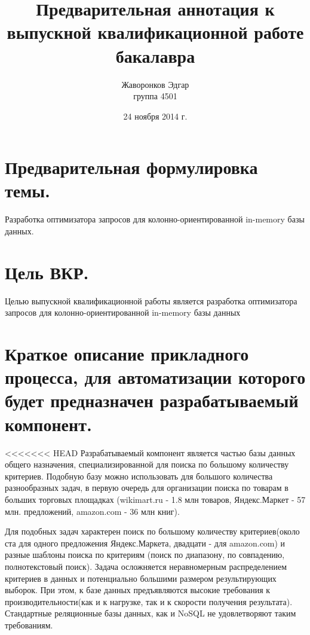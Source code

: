 \documentclass[12pt]{article}
\author{Жаворонков Эдгар \\ группа 4501}
\title{Предварительная аннотация к выпускной квалификационной работе бакалавра}
\date{24 ноября 2014 г.}
\begin{document}
    \section{Предварительная формулировка темы.}
        Разработка оптимизатора запросов для колонно-ориентированной in-memory базы данных.
    \section{Цель ВКР.}
        Целью выпускной квалификационной работы является разработка оптимизатора запросов для колонно-ориентированной in-memory базы данных
    \section{Краткое описание прикладного процесса, для автоматизации которого будет предназначен разрабатываемый компонент.}
<<<<<<< HEAD
        Разрабатываемый компонент является частью базы данных общего назначения, специализированной для поиска по большому количеству критериев. Подобную базу можно использовать для большого количества разнообразных задач, в первую очередь для организации поиска по товарам в больших торговых площадках (wikimart.ru - 1.8 млн товаров, Яндекс.Маркет - 57 млн. предложений, amazon.com - 36 млн книг).

        Для подобных задач характерен поиск по большому количеству критериев(около ста для одного предложения Яндекс.Маркета, двадцати - для amazon.com) и разные шаблоны поиска по критериям (поиск по диапазону, по совпадению, полнотекстовый поиск). Задача осложняется неравномерным распределением критериев в данных и потенциально большими размером результирующих выборок. При этом, к базе данных предъявляются высокие требования к производительности(как и к нагрузке, так и к скорости получения результата). Стандартные реляционные базы данных, как и NoSQL не удовлетворяют таким требованиям.
\end{document}
